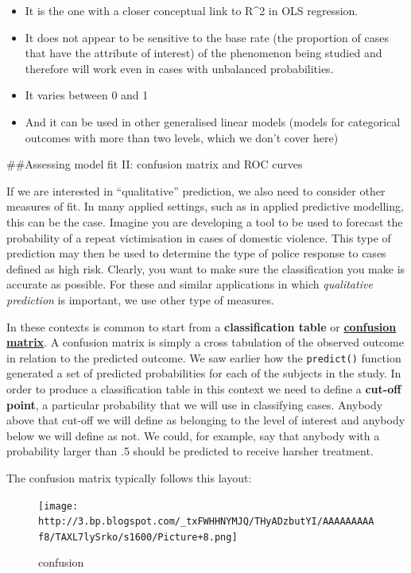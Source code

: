 \documentclass[]{book}
\theoremstyle{definition}
\theoremstyle{definition}
\theoremstyle{definition}
\theoremstyle{remark}
\begin{document}
\begin{itemize}
\item
  It is the one with a closer conceptual link to R\^{}2 in OLS
  regression.
\item
  It does not appear to be sensitive to the base rate (the proportion of
  cases that have the attribute of interest) of the phenomenon being
  studied and therefore will work even in cases with unbalanced
  probabilities.
\item
  It varies between 0 and 1
\item
  And it can be used in other generalised linear models (models for
  categorical outcomes with more than two levels, which we don't cover
  here)
\end{itemize}

\#\#Assessing model fit II: confusion matrix and ROC curves

If we are interested in ``qualitative'' prediction, we also need to
consider other measures of fit. In many applied settings, such as in
applied predictive modelling, this can be the case. Imagine you are
developing a tool to be used to forecast the probability of a repeat
victimisation in cases of domestic violence. This type of prediction may
then be used to determine the type of police response to cases defined
as high risk. Clearly, you want to make sure the classification you make
is accurate as possible. For these and similar applications in which
\emph{qualitative prediction} is important, we use other type of
measures.

In these contexts is common to start from a \textbf{classification
table} or
\href{http://en.wikipedia.org/wiki/Confusion_matrix}{\textbf{confusion
matrix}}. A confusion matrix is simply a cross tabulation of the
observed outcome in relation to the predicted outcome. We saw earlier
how the \texttt{predict()} function generated a set of predicted
probabilities for each of the subjects in the study. In order to produce
a classification table in this context we need to define a
\textbf{cut-off point}, a particular probability that we will use in
classifying cases. Anybody above that cut-off we will define as
belonging to the level of interest and anybody below we will define as
not. We could, for example, say that anybody with a probability larger
than .5 should be predicted to receive harsher treatment.

The confusion matrix typically follows this layout:

\begin{figure}
\centering
\texttt{[image: http://3.bp.blogspot.com/\_txFWHHNYMJQ/THyADzbutYI/AAAAAAAAAf8/TAXL7lySrko/s1600/Picture+8.png]}
\caption{confusion}
\end{figure}
\end{document}
